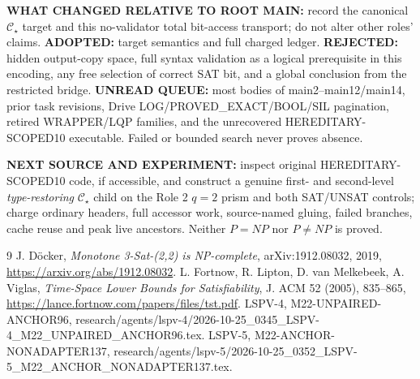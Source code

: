 \documentclass[11pt]{article}
\newcommand{\CS}{\mathcal C_\star}
\begin{document}
\textbf{WHAT CHANGED RELATIVE TO ROOT MAIN:} record the canonical $\CS$ target and this no-validator total bit-access transport; do not alter other roles' claims. \textbf{ADOPTED:} target semantics and full charged ledger. \textbf{REJECTED:} hidden output-copy space, full syntax validation as a logical prerequisite in this encoding, any free selection of correct SAT bit, and a global conclusion from the restricted bridge. \textbf{UNREAD QUEUE:} most bodies of main2--main12/main14, prior task revisions, Drive LOG/PROVED\_EXACT/BOOL/SIL pagination, retired WRAPPER/LQP families, and the unrecovered HEREDITARY-SCOPED10 executable. Failed or bounded search never proves absence.

\textbf{NEXT SOURCE AND EXPERIMENT:} inspect original HEREDITARY-SCOPED10 code, if accessible, and construct a genuine first- and second-level \emph{type-restoring} $\CS$ child on the Role 2 $q=2$ prism and both SAT/UNSAT controls; charge ordinary headers, full accessor work, source-named gluing, failed branches, cache reuse and peak live ancestors. Neither $P=NP$ nor $P\ne NP$ is proved.

\begin{thebibliography}{9}
 J. D\"ocker, \emph{Monotone 3-Sat-(2,2) is NP-complete}, arXiv:1912.08032, 2019, \url{https://arxiv.org/abs/1912.08032}.
 L. Fortnow, R. Lipton, D. van Melkebeek, A. Viglas, \emph{Time-Space Lower Bounds for Satisfiability}, J. ACM 52 (2005), 835--865, \url{https://lance.fortnow.com/papers/files/tst.pdf}.
 LSPV-4, M22-UNPAIRED-ANCHOR96, research/agents/lspv-4/2026-10-25\_0345\_LSPV-4\_M22\_UNPAIRED\_ANCHOR96.tex.
 LSPV-5, M22-ANCHOR-NONADAPTER137, research/agents/lspv-5/2026-10-25\_0352\_LSPV-5\_M22\_ANCHOR\_NONADAPTER137.tex.
\end{thebibliography}
\end{document}
